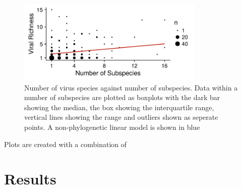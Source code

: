 \begin{knitrout}\footnotesize
{}\color{fgcolor}\begin{figure}[t]

{\centering \includegraphics[width=0.8\textwidth]{figure/boxplot-1} 

}

\caption[Number of virus species against number of subspecies]{Number of virus species against number of subspecies. Data within a number of subspecies are plotted as boxplots with the dark bar showing the median, the box showing the interquartile range, vertical lines showing the range and outliers shown as seperate points. A non-phylogenetic linear model is shown in blue}\label{fig:boxplot}
\end{figure}


\end{knitrout}











\clearpage
















Plots are created with a combination of \cite{ggplot2, palettetown, dotwhisker, ggtree}


\clearpage
\section{Results}


